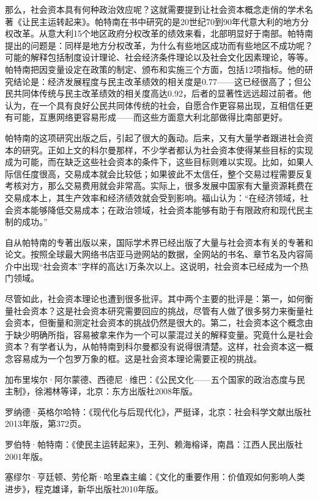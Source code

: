 那么，社会资本具有何种政治效应呢？这就需要提到让社会资本概念走俏的学术名著《让民主运转起来》。帕特南在书中研究的是20世纪70到90年代意大利的地方分权改革。从意大利15个地区政府分权改革的绩效来看，北部明显好于南部。帕特南提出的问题是：同样是地方分权改革，为什么有些地区成功而有些地区不成功呢？可能的解释包括制度设计理论、社会经济条件理论以及社会文化因素理论，等等。帕特南把因变量设定在政策的制定、颁布和实施三个方面，包括12项指标。他的研究结论是：经济发展程度与民主改革绩效的相关度是0.77——这已经很高了；但公民共同体传统与民主改革绩效的相关度高达0.92，后者的显著性远远超过前者。他认为，在一个具有良好公民共同体传统的社会，自愿合作更容易出现，互相信任更有可能，互惠网络更容易形成——而这些方面意大利北部做得比南部更好。

帕特南的这项研究出版之后，引起了很大的轰动。后来，又有大量学者跟进社会资本的研究。正如上文的科尔曼那样，不少学者都认为社会资本使得某些目标的实现成为可能，而在缺乏这些社会资本的条件下，这些目标则难以实现。比如，如果人际信任度很高，交易成本就会比较低；如果彼此不太信任，整个交易过程需要反复考核对方，那么交易费用就会非常高。实际上，很多发展中国家有大量资源耗费在交易成本上，其生产效率和经济绩效就会受到影响。福山认为：“在经济领域，社会资本能够降低交易成本；在政治领域，社会资本能够有助于有限政府和现代民主制的成功。”

自从帕特南的专著出版以来，国际学术界已经出版了大量与社会资本有关的专著和论文。按照全球最大网络书店亚马逊网站的数据，全网站的书名、章节名及内容简介中出现“社会资本”字样的高达1万条次以上。这说明，社会资本已经成为一个热门领域。

尽管如此，社会资本理论也遭到很多批评。其中两个主要的批评是：第一，如何衡量社会资本？这是社会资本研究需要回应的挑战，尽管有人做了很多努力来衡量社会资本，但衡量和测定社会资本的挑战仍然是很大的。第二，社会资本这个概念由于缺少明确所指，容易被拿来作为一个可以蒙混过关的解释变量。究竟什么是社会资本？有学者认为，从帕特南到科尔曼都没有说得很清楚。这样，社会资本这一概念容易成为一个包罗万象的框。这是社会资本理论需要正视的挑战。


加布里埃尔·阿尔蒙德、西德尼·维巴：《公民文化——五个国家的政治态度与民主制》，徐湘林等译，北京：东方出版社2008年版。

罗纳德·英格尔哈特：《现代化与后现代化》，严挺译，北京：社会科学文献出版社2013年版，第372页。

罗伯特·帕特南：《使民主运转起来》，王列、赖海榕译，南昌：江西人民出版社2001年版。

塞缪尔·亨廷顿、劳伦斯·哈里森主编：《文化的重要作用：价值观如何影响人类进步》，程克雄译，新华出版社2010年版。
